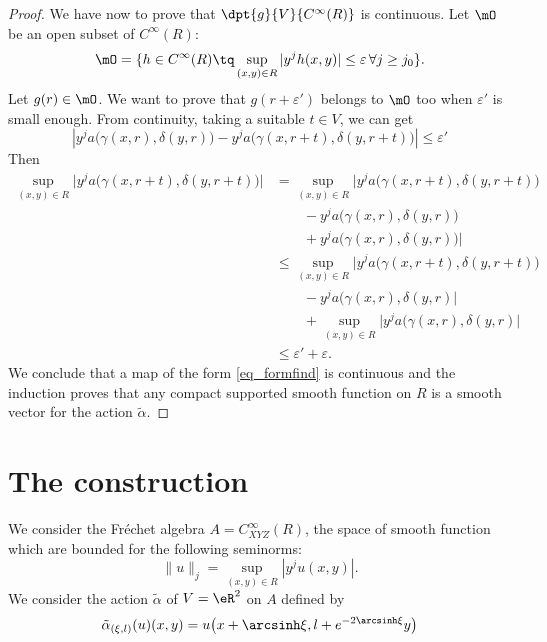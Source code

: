 \begin{proof}
We have now to prove that $\dpt{ g }{ V }{  C^{\infty}(R) }$ is continuous. Let $\mO$ be an open subset of $ C^{\infty}(R)$:
\[ 
  \mO=\{ h\in C^{\infty}(R)\tq \sup_{(x,y)\in R}| y^jh(x,y)  |\leq\varepsilon\,\forall j\geq j_0 \}.
\]
Let $g(r)\in\mO$. We want to prove that $g(r+\varepsilon')$ belongs to $\mO$ too when $\varepsilon'$ is small enough. From continuity, taking a suitable $t\in V$, we can get
\[ 
   \left| y^ja\big( \gamma(x,r),\delta(y,r) \big)-y^ja\big( \gamma(x,r+t),\delta(y,r+t) \big) \right|\leq\varepsilon'
\]
Then
\begin{equation}
\begin{split}
\sup_{(x,y)\in R}\Big|  y^ja\big( \gamma(x,r+t),\delta(y,r+t) \big)   \Big|&=
	\sup_{(x,y)\in R}\Big|   y^ja\big( \gamma(x,r+t),\delta(y,r+t) \big)\\
		&\qquad-y^ja\big( \gamma(x,r),\delta(y,r) \big)\\
		&\qquad+ y^ja\big( \gamma(x,r),\delta(y,r) \big) \Big|\\
		&\leq \sup_{(x,y)\in R}\Big|  y^ja\big( \gamma(x,r+t),\delta(y,r+t) \big)\\
		&\qquad  - y^ja\big( \gamma(x,r),\delta(y,r)  \Big|\\
		&\qquad + \sup_{(x,y)\in R}\Big|   y^ja\big( \gamma(x,r),\delta(y,r)  \Big|\\
		&\leq\varepsilon'+\varepsilon.
\end{split}
\end{equation}
We conclude that a map of the form \eqref{eq_formfind}  is continuous and the induction proves that any compact supported smooth function on $R$ is a smooth vector for the action $\tilde\alpha$.


\end{proof}


%
   \section{The construction}
%

We consider the Fréchet algebra $A= C^{\infty}_{XYZ}(R)$, the space of smooth function which are bounded for the following seminorms:
\begin{equation}
\| u \|_j=\sup_{(x,y)\in R}| y^j u(x,y) |.
\end{equation}
We consider the action $\tilde\alpha$ of $V=\eR^2$ on $A$ defined by
\begin{equation}
\tilde\alpha_{(\xi,l)}(u)(x,y)=u\big( x+\arcsinh\xi,l+e^{-2\arcsinh\xi}y \big)
\end{equation}


